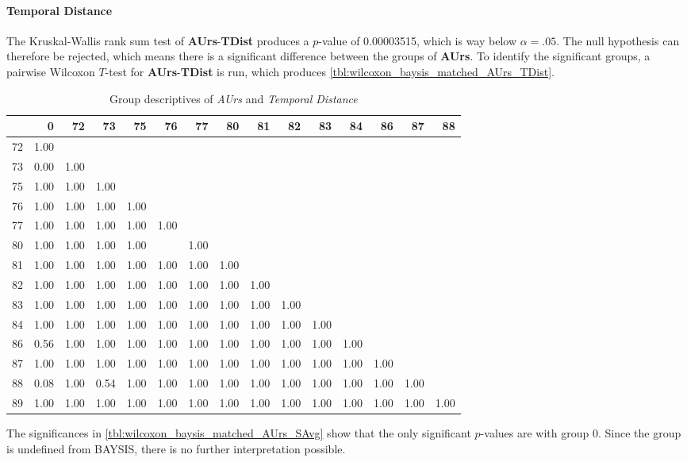 \paragraph{Temporal Distance}
The Kruskal-Wallis rank sum test of \textbf{AUrs}-\textbf{TDist} produces a $p$-value of 0.00003515, which is way below $\alpha=.05$. The null hypothesis can therefore be rejected, which means there is a significant difference between the groups of \textbf{AUrs}. To identify the significant groups, a pairwise Wilcoxon $T$-test for \textbf{AUrs}-\textbf{TDist} is run, which produces \autoref{tbl:wilcoxon_baysis_matched_AUrs_TDist}.
\begin{table}[ht]
	\tiny
	\centering
	\begin{tabular}{rrrrrrrrrrrrrrr}
        \toprule
        & 0 & 72 & 73 & 75 & 76 & 77 & 80 & 81 & 82 & 83 & 84 & 86 & 87 & 88 \\ 
        \midrule
        72 & 1.00 &  &  &  &  &  &  &  &  &  &  &  &  &  \\ 
        73 & 0.00 & 1.00 &  &  &  &  &  &  &  &  &  &  &  &  \\ 
        75 & 1.00 & 1.00 & 1.00 &  &  &  &  &  &  &  &  &  &  &  \\ 
        76 & 1.00 & 1.00 & 1.00 & 1.00 &  &  &  &  &  &  &  &  &  &  \\ 
        77 & 1.00 & 1.00 & 1.00 & 1.00 & 1.00 &  &  &  &  &  &  &  &  &  \\ 
        80 & 1.00 & 1.00 & 1.00 & 1.00 &  & 1.00 &  &  &  &  &  &  &  &  \\ 
        81 & 1.00 & 1.00 & 1.00 & 1.00 & 1.00 & 1.00 & 1.00 &  &  &  &  &  &  &  \\ 
        82 & 1.00 & 1.00 & 1.00 & 1.00 & 1.00 & 1.00 & 1.00 & 1.00 &  &  &  &  &  &  \\ 
        83 & 1.00 & 1.00 & 1.00 & 1.00 & 1.00 & 1.00 & 1.00 & 1.00 & 1.00 &  &  &  &  &  \\ 
        84 & 1.00 & 1.00 & 1.00 & 1.00 & 1.00 & 1.00 & 1.00 & 1.00 & 1.00 & 1.00 &  &  &  &  \\ 
        86 & 0.56 & 1.00 & 1.00 & 1.00 & 1.00 & 1.00 & 1.00 & 1.00 & 1.00 & 1.00 & 1.00 &  &  &  \\ 
        87 & 1.00 & 1.00 & 1.00 & 1.00 & 1.00 & 1.00 & 1.00 & 1.00 & 1.00 & 1.00 & 1.00 & 1.00 &  &  \\ 
        88 & 0.08 & 1.00 & 0.54 & 1.00 & 1.00 & 1.00 & 1.00 & 1.00 & 1.00 & 1.00 & 1.00 & 1.00 & 1.00 &  \\ 
        89 & 1.00 & 1.00 & 1.00 & 1.00 & 1.00 & 1.00 & 1.00 & 1.00 & 1.00 & 1.00 & 1.00 & 1.00 & 1.00 & 1.00 \\ 
        \bottomrule
	  \end{tabular}
	\caption{Group descriptives of \textit{AUrs} and \textit{Temporal Distance}}
	\label{tbl:wilcoxon_baysis_matched_AUrs_TDist}
\end{table}
The significances in \autoref{tbl:wilcoxon_baysis_matched_AUrs_SAvg} show that the only significant $p$-values are with group 0. Since the group is undefined from BAYSIS, there is no further interpretation possible.


